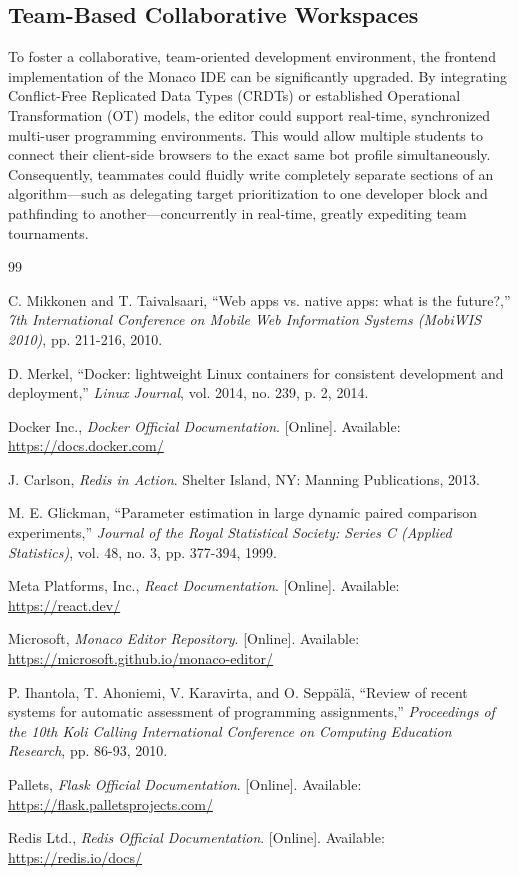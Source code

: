 \documentclass[12pt,a4paper]{report}
\begin{document}
\subsection{Team-Based Collaborative Workspaces}
To foster a collaborative, team-oriented development environment, the frontend implementation of the Monaco IDE can be significantly upgraded. By integrating Conflict-Free Replicated Data Types (CRDTs) or established Operational Transformation (OT) models, the editor could support real-time, synchronized multi-user programming environments. This would allow multiple students to connect their client-side browsers to the exact same bot profile simultaneously. Consequently, teammates could fluidly write completely separate sections of an algorithm—such as delegating target prioritization to one developer block and pathfinding to another—concurrently in real-time, greatly expediting team tournaments.

\cleardoublepage
{}
\begin{thebibliography}{99}

C. Mikkonen and T. Taivalsaari, ``Web apps vs. native apps: what is the future?,'' \emph{7th International Conference on Mobile Web Information Systems (MobiWIS 2010)}, pp. 211-216, 2010.

D. Merkel, ``Docker: lightweight Linux containers for consistent development and deployment,'' \emph{Linux Journal}, vol. 2014, no. 239, p. 2, 2014.

Docker Inc., \emph{Docker Official Documentation}. [Online]. Available: \url{https://docs.docker.com/}

J. Carlson, \emph{Redis in Action}. Shelter Island, NY: Manning Publications, 2013.

M. E. Glickman, ``Parameter estimation in large dynamic paired comparison experiments,'' \emph{Journal of the Royal Statistical Society: Series C (Applied Statistics)}, vol. 48, no. 3, pp. 377-394, 1999.

Meta Platforms, Inc., \emph{React Documentation}. [Online]. Available: \url{https://react.dev/}

Microsoft, \emph{Monaco Editor Repository}. [Online]. Available: \url{https://microsoft.github.io/monaco-editor/}

P. Ihantola, T. Ahoniemi, V. Karavirta, and O. Seppälä, ``Review of recent systems for automatic assessment of programming assignments,'' \emph{Proceedings of the 10th Koli Calling International Conference on Computing Education Research}, pp. 86-93, 2010.

Pallets, \emph{Flask Official Documentation}. [Online]. Available: \url{https://flask.palletsprojects.com/}

Redis Ltd., \emph{Redis Official Documentation}. [Online]. Available: \url{https://redis.io/docs/}

\end{thebibliography}
\end{document}
